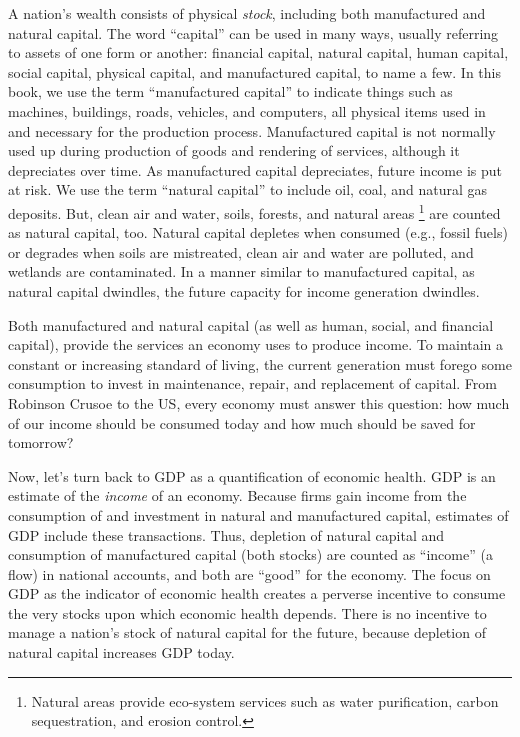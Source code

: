 A nation's wealth consists of physical \emph{stock},  
including both manufactured and natural capital. 
The word ``capital'' can be used in many ways, usually referring to assets
of one form or another: 
financial capital, 
natural capital, 
human capital, 
social capital,
physical capital, and
manufactured capital, 
to name a few.
In this book, 
we use the term ``manufactured capital'' 
to indicate things such as
machines, 
buildings, 
roads,
vehicles, and
computers,
all physical items used in and necessary for the production process.
Manufactured capital is not normally used up during production 
of goods and rendering of services, 
although it depreciates over time.
As manufactured capital depreciates, future income is put at risk.
We use the term ``natural capital'' to include oil, coal, and natural gas deposits.
But, clean air and water, soils, forests, and natural areas%
	\footnote{
	Natural areas provide eco-system services such as 
	water purification, 
	carbon sequestration, 
	and erosion control.
	}
are counted as natural capital, too.
Natural capital depletes when consumed (e.g., fossil fuels)
or degrades when 
soils are mistreated, 
clean air and water are polluted, 
and wetlands are contaminated. 
In a manner similar to manufactured capital, 
as natural capital dwindles, the future
capacity for income generation dwindles. 

Both manufactured and natural capital
(as well as human, social, and financial capital), 
provide the services an economy uses to produce income. 
To maintain a constant or increasing
standard of living, the current generation must
forego some consumption to 
invest in maintenance, repair, and
replacement of capital. 
From Robinson Crusoe to the US, 
every economy must answer this question: 
how much of our income should be consumed today and how much should be saved
for tomorrow?

Now, let's turn back to GDP as a quantification of economic health.
GDP is an estimate of the \emph{income} of an economy.
Because firms gain income from the 
consumption of and investment in 
natural and manufactured capital,
estimates of GDP include these transactions.
Thus, depletion of natural capital and
consumption of manufactured capital (both stocks) 
are counted as ``income'' (a flow) in national accounts,
and both are ``good'' for the economy.
The focus on GDP as the indicator of economic health
creates a perverse incentive to consume the very stocks upon which
economic health depends. 
There is no incentive to manage 
a nation's stock of natural capital for the future, 
because depletion of natural capital increases
GDP today.

